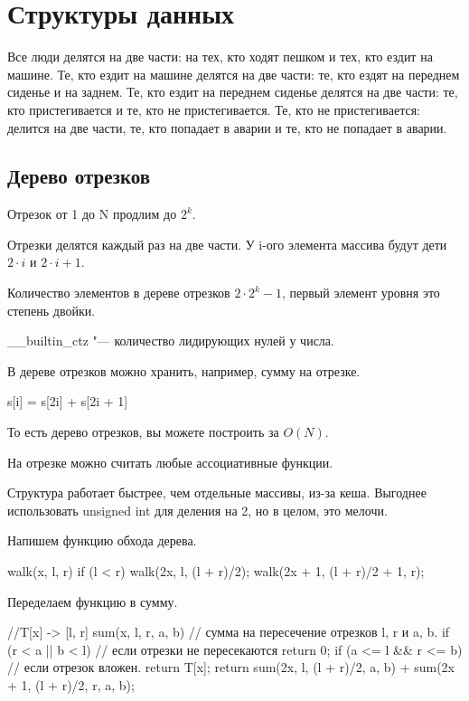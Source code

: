 \chapter{Структуры данных}

Все люди делятся на две части: на тех, кто ходят пешком 
и тех, кто ездит на машине. Те, кто ездит на машине делятся на две части: 
те, кто ездят на переднем сиденье и на заднем. Те, кто ездит на переднем сиденье 
делятся на две части: те, кто пристегивается и те, кто не пристегивается. Те, кто не 
пристегивается: делится на две части, те, кто попадает в аварии и те, кто не попадает в аварии.

\section{Дерево отрезков} 

Отрезок от 1 до N продлим до $2^k$. 

Отрезки делятся каждый раз на две части. У i-ого элемента массива будут дети $2 \cdot i$ и $2 \cdot i + 1$.

Количество элементов в дереве отрезков $2 \cdot 2^{k} - 1$, первый элемент уровня это степень двойки. 

\_\_builtin\_ctz "--- количество лидирующих нулей у числа. 

В дереве отрезков можно хранить, например, сумму на отрезке. 

s[i] = s[2i] + s[2i + 1] 

То есть дерево отрезков, вы можете построить за $O(N)$. 

На отрезке можно считать любые ассоциативные функции. 

Структура работает быстрее, чем отдельные массивы, из-за кеша. 
Выгоднее использовать unsigned int для деления  на 2, но в целом, это мелочи.

Напишем функцию обхода дерева.
\begin{cppcode}
walk(x, l, r) {
    if (l < r) {
        walk(2x, l, (l + r)/2);
        walk(2x + 1, (l + r)/2 + 1, r);
    }
}
\end{cppcode}

Переделаем функцию в сумму. 

\begin{cppcode}
//T[x] -> [l, r]
sum(x, l, r, a, b) { // сумма на пересечение отрезков l, r и a, b.
    if (r < a || b < l)  { // если  отрезки не пересекаются
        return 0;
    }
    if (a <= l && r <= b) { // если отрезок вложен. 
        return T[x];
    }
    return sum(2x, l, (l + r)/2, a, b) +
    sum(2x + 1, (l + r)/2, r, a, b);
}
\end{cppcode}

